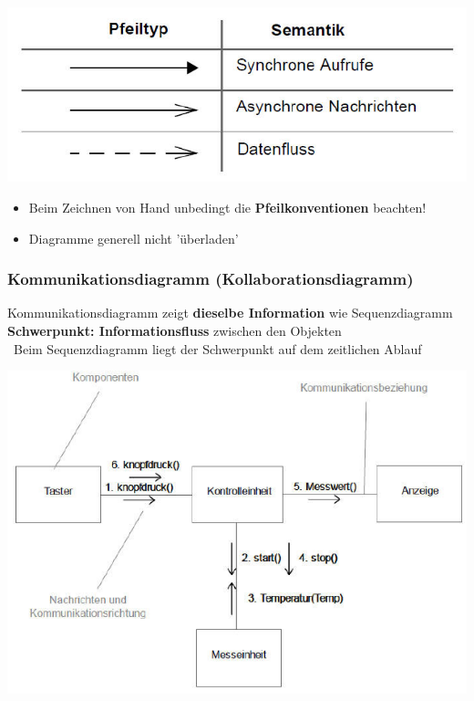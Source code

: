 \begin{minipage}[c]{0.45\columnwidth}
    \includegraphics[width=\columnwidth]{images/sequenzdiagramm_pfeile.pdf}
\end{minipage}
\hfill
\begin{minipage}[c]{0.52\columnwidth}
    \begin{itemize}
        \item Beim Zeichnen von Hand unbedingt die \textbf{Pfeilkonventionen} beachten!
        \item Diagramme generell nicht 'überladen'
    \end{itemize}
\end{minipage}

\columnbreak


\subsubsection{Kommunikationsdiagramm (Kollaborationsdiagramm)}

\begin{outline}
    \1 Kommunikationsdiagramm zeigt \textbf{dieselbe Information} wie Sequenzdiagramm
    \1 \textbf{Schwerpunkt: Informationsfluss} zwischen den Objekten \\
    \textrightarrow\ Beim Sequenzdiagramm liegt der Schwerpunkt auf dem zeitlichen Ablauf
\end{outline}

\begin{center}
    \includegraphics[width=0.7\columnwidth]{images/kommunikationsdiagramm.pdf}
\end{center}


